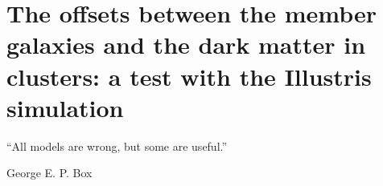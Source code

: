 
\setcounter{chapter}{2}
\chapter{The offsets between the member galaxies and the dark matter in
clusters: a test with the Illustris simulation}{}{}
\label{chapter3}
\epigraph{``All models are wrong, but some are useful.''}{George E. P. Box} 
